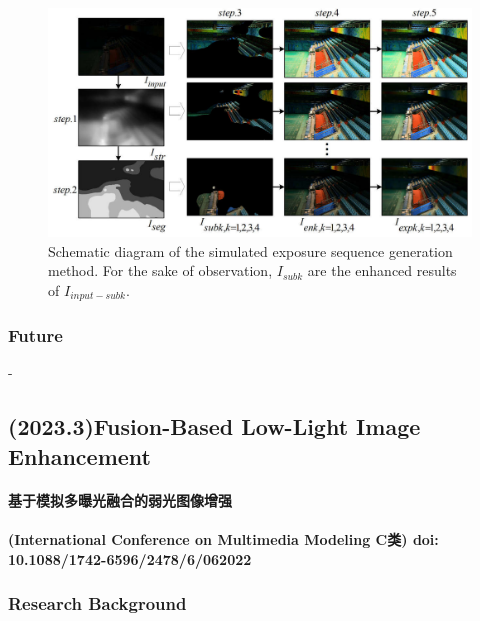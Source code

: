 \documentclass[a4paper]{ctexart}
\begin{document}
	\begin{figure}[htbp]
		\centering 
		\includegraphics[width=\columnwidth]{picture/LLIE/Multi-exposure fusion/Schematic diagram}
		\caption{
			\label{fig: Schematic diagram} 
			Schematic diagram of the simulated exposure sequence generation method. For the sake of observation, $I_{subk}$ are the enhanced results of $I_{input-subk}$.
		}
	\end{figure}
	
	\subsubsection{Future}
	
	-
	
	\subsection{(2023.3)Fusion-Based Low-Light Image Enhancement}
	
	\paragraph{基于模拟多曝光融合的弱光图像增强}
	
	\paragraph{(International Conference on Multimedia Modeling C类) doi: 10.1088/1742-6596/2478/6/062022}
	
	\subsubsection{Research Background}
	
\end{document}
